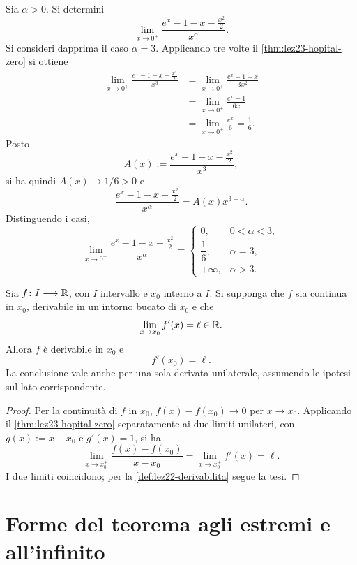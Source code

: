 \begin{example}
\label{ex:lez23-esponenziale-parametro}
Sia \(\alpha>0\). Si determini
\[
  \lim_{x\to0^+}
  \frac{e^x-1-x-\frac{x^2}{2}}{x^\alpha}.
\]
Si consideri dapprima il caso \(\alpha=3\).
Applicando tre volte il \cref{thm:lez23-hopital-zero}
si ottiene
\[
\begin{aligned}
  \lim_{x\to0^+}\frac{e^x-1-x-\frac{x^2}{2}}{x^3}
  &=\lim_{x\to0^+}\frac{e^x-1-x}{3x^2}\\
  &=\lim_{x\to0^+}\frac{e^x-1}{6x}\\
  &=\lim_{x\to0^+}\frac{e^x}{6}=\frac16.
\end{aligned}
\]
Posto
\[
  A(x):=\frac{e^x-1-x-\frac{x^2}{2}}{x^3},
\]
si ha quindi \(A(x)\to1/6>0\) e
\[
  \frac{e^x-1-x-\frac{x^2}{2}}{x^\alpha}
  =A(x)x^{3-\alpha}.
\]
Distinguendo i casi,
\[
  \lim_{x\to0^+}
  \frac{e^x-1-x-\frac{x^2}{2}}{x^\alpha}
  =\begin{cases}
    0, & 0<\alpha<3,\\[2pt]
    \dfrac16, & \alpha=3,\\[4pt]
    +\infty, & \alpha>3.
  \end{cases}
\]
\end{example}

\begin{corollary}
\label{cor:lez23-limite-derivata}
Sia \(f\colon I\longrightarrow\mathbb{R}\), con \(I\)
intervallo e \(x_0\) interno a \(I\). Si supponga
che \(f\) sia continua in \(x_0\), derivabile
in un intorno bucato di \(x_0\) e che
\[
  \lim_{x\to x_0}f'(x)=\ell\in\mathbb{R}.
\]
Allora \(f\) è derivabile in \(x_0\) e
\[
  f'(x_0)=\ell.
\]
La conclusione vale anche per una sola derivata
unilaterale, assumendo le ipotesi sul lato corrispondente.
\end{corollary}

\begin{proof}
Per la continuità di \(f\) in \(x_0\),
\(f(x)-f(x_0)\to0\) per \(x\to x_0\).
Applicando il \cref{thm:lez23-hopital-zero}
separatamente ai due limiti unilateri, con
\(g(x):=x-x_0\) e \(g'(x)=1\), si ha
\[
  \lim_{x\to x_0^\pm}
  \frac{f(x)-f(x_0)}{x-x_0}
  =\lim_{x\to x_0^\pm}f'(x)=\ell.
\]
I due limiti coincidono; per la
\cref{def:lez22-derivabilita} segue la tesi.
\end{proof}

\section{Forme del teorema agli estremi e all'infinito}
\label{sec:lez23-hopital-infinito}


